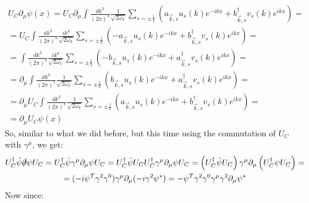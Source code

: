 \documentclass{article}
\begin{document}
\begin{equation}
\begin{gathered}
    U_C \partial_\mu \psi(x) = 
    U_C \partial_\mu \int \frac{dk^3}{(2\pi)^3}\frac{1}{\sqrt{2\omega_k}}\sum_{s=\pm\frac{1}{2}} \left(
        a_{\vec{k}, s}u_s(k)e^{-ikx} + b_{\vec{k}, s}^\dagger v_s(k)e^{ikx}
    \right) = \\ = 
    U_C \int \frac{dk^3}{(2\pi)^3}\frac{ik^\mu}{\sqrt{2\omega_k}}\sum_{s=\pm\frac{1}{2}} \left(
        -a_{\vec{k}, s}u_s(k)e^{-ikx} + b_{\vec{k}, s}^\dagger v_s(k)e^{ikx}
    \right) = \\ = 
    \int \frac{dk^3}{(2\pi)^3}\frac{ik^\mu}{\sqrt{2\omega_k}}\sum_{s=\pm\frac{1}{2}} \left(
        -b_{\vec{k}, s}u_s(k)e^{-ikx} + a_{\vec{k}, s}^\dagger v_s(k)e^{ikx}
    \right) = \\ = 
    \partial_\mu \int \frac{dk^3}{(2\pi)^3}\frac{1}{\sqrt{2\omega_k}}\sum_{s=\pm\frac{1}{2}} \left(
        b_{\vec{k}, s}u_s(k)e^{-ikx} + a_{\vec{k}, s}^\dagger v_s(k)e^{ikx}
    \right) = \\ = 
    \partial_\mu U_C \int \frac{dk^3}{(2\pi)^3}\frac{1}{\sqrt{2\omega_k}}\sum_{s=\pm\frac{1}{2}} \left(
        a_{\vec{k}, s}u_s(k)e^{-ikx} + b_{\vec{k}, s}^\dagger v_s(k)e^{ikx}
    \right) = \\ = \partial_\mu U_C \psi(x)
\end{gathered}
\end{equation}
So, similar to what we did before, but this time using the commutation of $U_C$ with $\gamma^\mu$, we get:
\begin{equation}
\begin{gathered}
    U_C^\dagger \bar{\psi}\slashed{\partial}\psi U_C =
    U_C^\dagger \bar{\psi}\gamma^\mu\partial_\mu\psi U_C =
    U_C^\dagger \bar{\psi} U_C U_C^\dagger \gamma^\mu\partial_\mu \psi U_C =
    \left(U_C^\dagger \bar{\psi} U_C\right) \gamma^\mu\partial_\mu \left(U_C^\dagger \psi U_C\right) = \\ =
     (-i\psi^T \gamma^2\gamma^0) \gamma^\mu\partial_\mu (-i\gamma^2\psi^*) = -\psi^T \gamma^2\gamma^0\gamma^\mu\gamma^2\partial_\mu\psi^*
\end{gathered}
\end{equation}
Now since:
\end{document}
